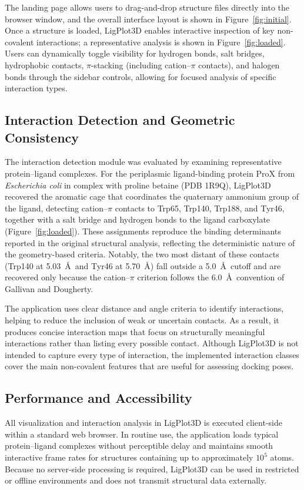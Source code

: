 \documentclass[journal=jacsat,manuscript=article]{achemso}
\begin{document}
The landing page allows users to drag-and-drop structure files directly into the browser window, and the overall interface layout is shown in Figure~\ref{fig:initial}. Once a structure is loaded, LigPlot3D enables interactive inspection of key non-covalent interactions; a representative analysis is shown in Figure~\ref{fig:loaded}. Users can dynamically toggle visibility for hydrogen bonds, salt bridges, hydrophobic contacts, $\pi$-stacking (including cation--$\pi$ contacts), and halogen bonds through the sidebar controls, allowing for focused analysis of specific interaction types.

\subsection{Interaction Detection and Geometric Consistency}
The interaction detection module was evaluated by examining representative protein--ligand complexes. For the periplasmic ligand-binding protein ProX from \textit{Escherichia coli} in complex with proline betaine (PDB 1R9Q)\cite{schiefner2004cation}, LigPlot3D recovered the aromatic cage that coordinates the quaternary ammonium group of the ligand, detecting cation--$\pi$ contacts to Trp65, Trp140, Trp188, and Tyr46, together with a salt bridge and hydrogen bonds to the ligand carboxylate (Figure~\ref{fig:loaded}). These assignments reproduce the binding determinants reported in the original structural analysis, reflecting the deterministic nature of the geometry-based criteria. Notably, the two most distant of these contacts (Trp140 at 5.03~\AA\ and Tyr46 at 5.70~\AA) fall outside a 5.0~\AA\ cutoff and are recovered only because the cation--$\pi$ criterion follows the 6.0~\AA\ convention of Gallivan and Dougherty\cite{gallivan1999cation}.

The application uses clear distance and angle criteria to identify interactions, helping to reduce the inclusion of weak or uncertain contacts. As a result, it produces concise interaction maps that focus on structurally meaningful interactions rather than listing every possible contact. Although LigPlot3D is not intended to capture every type of interaction, the implemented interaction classes cover the main non-covalent features that are useful for assessing docking poses.


\subsection{Performance and Accessibility}
All visualization and interaction analysis in LigPlot3D is executed client-side within a standard web browser. In routine use, the application loads typical protein--ligand complexes without perceptible delay and maintains smooth interactive frame rates for structures containing up to approximately $10^5$ atoms. Because no server-side processing is required, LigPlot3D can be used in restricted or offline environments and does not transmit structural data externally.
\end{document}

